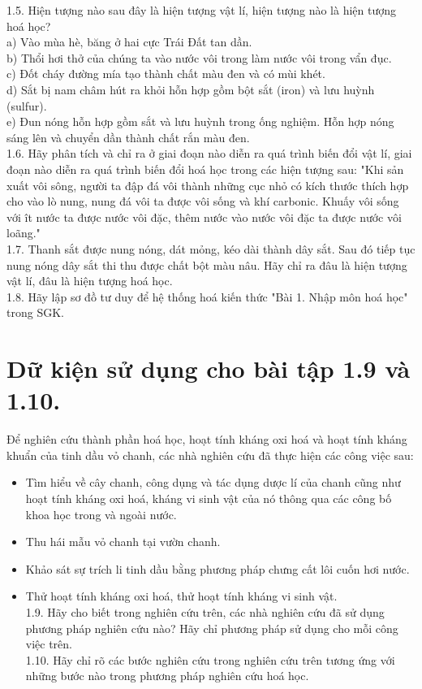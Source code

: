 \documentclass[10pt]{article}
\begin{document}
\captionsetup{singlelinecheck=false}
1.5. Hiện tượng nào sau đây là hiện tượng vật lí, hiện tượng nào là hiện tượng hoá học?\\
a) Vào mùa hè, băng ở hai cực Trái Đất tan dần.\\
b) Thổi hơi thở của chúng ta vào nước vôi trong làm nước vôi trong vẩn đục.\\
c) Đốt cháy đường mía tạo thành chất màu đen và có mùi khét.\\
d) Sắt bị nam châm hút ra khỏi hỗn hợp gồm bột sắt (iron) và lưu huỳnh (sulfur).\\
e) Đun nóng hỗn hợp gồm sắt và lưu huỳnh trong ống nghiệm. Hỗn hợp nóng sáng lên và chuyển dần thành chất rắn màu đen.\\
1.6. Hãy phân tích và chỉ ra ở giai đoạn nào diễn ra quá trình biến đổi vật lí, giai đoạn nào diễn ra quá trình biến đổi hoá học trong các hiện tượng sau: "Khi sản xuất vôi sông, người ta đập đá vôi thành những cục nhỏ có kích thước thích hợp cho vào lò nung, nung đá vôi ta được vôi sống và khí carbonic. Khuấy vôi sống với ît nước ta được nước vôi đặc, thêm nước vào nước vôi đặc ta được nước vôi loãng."\\
1.7. Thanh sắt được nung nóng, dát mỏng, kéo dài thành dây sắt. Sau đó tiếp tục nung nóng dây sắt thi thu được chất bột màu nâu. Hãy chỉ ra đâu là hiện tượng vật lí, đâu là hiện tượng hoá học.\\
1.8. Hãy lập sơ đồ tư duy để hệ thống hoá kiến thức "Bài 1. Nhập môn hoá học" trong SGK.

\section*{Dữ kiện sử dụng cho bài tập 1.9 và 1.10.}
Để nghiên cứu thành phần hoá học, hoạt tính kháng oxi hoá và hoạt tính kháng khuẩn của tinh dầu vỏ chanh, các nhà nghiên cứu đã thực hiện các công việc sau:

\begin{itemize}
  \item Tìm hiểu về cây chanh, công dụng và tác dụng dược lí của chanh cũng như hoạt tính kháng oxi hoá, kháng vi sinh vật của nó thông qua các công bố khoa học trong và ngoài nước.
  \item Thu hái mẫu vỏ chanh tại vườn chanh.
  \item Khảo sát sự trích li tinh dầu bằng phương pháp chưng cất lôi cuốn hơi nước.
  \item Thử hoạt tính kháng oxi hoá, thử hoạt tính kháng vi sinh vật.\\
1.9. Hãy cho biết trong nghiên cứu trên, các nhà nghiên cứu đã sử dụng phương pháp nghiên cứu nào? Hãy chỉ phương pháp sử dụng cho mỗi công việc trên.\\
1.10. Hãy chỉ rõ các bước nghiên cứu trong nghiên cứu trên tương ứng với những bước nào trong phương pháp nghiên cứu hoá học.
\end{itemize}
\end{document}
